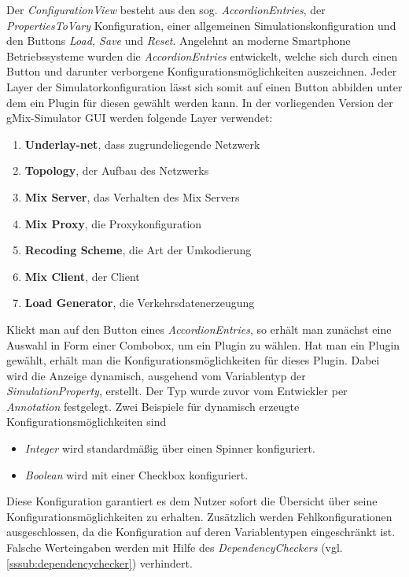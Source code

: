 \documentclass[a4paper, 11pt]{article} %
\begin{document}
Der \emph{ConfigurationView} besteht aus den sog. \emph{AccordionEntries}, der \emph{PropertiesToVary} Konfiguration, einer allgemeinen Simulationskonfiguration und den Buttons \emph{Load, Save} und \emph{Reset}. Angelehnt an moderne Smartphone Betriebssysteme wurden die \emph{AccordionEntries} entwickelt, welche sich durch einen Button und darunter verborgene Konfigurationsmöglichkeiten auszeichnen. Jeder Layer der Simulatorkonfiguration lässt sich somit auf einen Button abbilden unter dem ein Plugin für diesen gewählt werden kann. In der vorliegenden Version der gMix-Simulator GUI werden folgende Layer verwendet:
\begin{enumerate}
\item \textbf{Underlay-net}, dass zugrundeliegende Netzwerk
\item \textbf{Topology}, der Aufbau des Netzwerks
\item \textbf{Mix Server}, das Verhalten des Mix Servers
\item \textbf{Mix Proxy}, die Proxykonfiguration
\item \textbf{Recoding Scheme}, die Art der Umkodierung
\item \textbf{Mix Client}, der Client
\item \textbf{Load Generator}, die Verkehrsdatenerzeugung
\end{enumerate}
 Klickt man auf den Button eines \emph{AccordionEntries}, so erhält man zunächst eine Auswahl in Form einer Combobox, um ein Plugin zu wählen. Hat man ein Plugin gewählt, erhält man die Konfigurationsmöglichkeiten für dieses Plugin. Dabei wird die Anzeige dynamisch, ausgehend vom Variablentyp der \emph{SimulationProperty}, erstellt. Der Typ wurde zuvor vom Entwickler per \emph{Annotation} festgelegt. Zwei Beispiele für dynamisch erzeugte Konfigurationsmöglichkeiten sind
 \begin{itemize}
 \item \emph{Integer} wird standardmäßig über einen Spinner konfiguriert. 
 \item \emph{Boolean} wird mit einer Checkbox konfiguriert.
 \end{itemize}
 Diese Konfiguration garantiert es dem Nutzer sofort die Übersicht über seine Konfigurationsmöglichkeiten zu erhalten. Zusätzlich werden Fehlkonfigurationen ausgeschlossen, da die Konfiguration auf deren Variablentypen eingeschränkt ist. Falsche Werteingaben werden mit Hilfe des \emph{DependencyCheckers} (vgl. \ref{sssub:dependencychecker}) verhindert. \\
\end{document}
